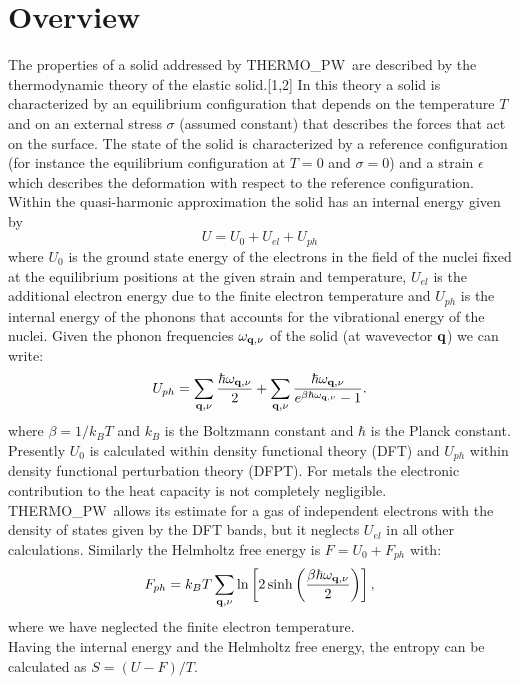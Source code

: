 \documentclass[12pt,a4paper]{article}
\def\tpw{{\sc THERMO\_PW}}
\begin{document}
\section{\color{coral}Overview}
The properties of a solid addressed by \tpw\ are described by the thermodynamic
theory of the elastic solid.[1,2] In this theory a solid is characterized by an
equilibrium configuration that depends on the temperature $T$ and on an
external stress $\sigma$ (assumed constant) that describes the forces 
that act on the surface. The state
of the solid is characterized by a reference configuration 
(for instance the equilibrium configuration at $T=0$ and $\sigma=0$) and 
a strain $\epsilon$ which describes the deformation with respect to the 
reference configuration. 
Within the quasi-harmonic approximation the solid has an internal
energy given by  
\begin{equation}
U=U_0 + U_{el} + U_{ph}
\end{equation}
where $U_0$ is the ground state energy of the electrons in the field 
of the nuclei fixed at the equilibrium positions at the given strain and
temperature, $U_{el}$ is the additional electron energy due to the 
finite electron temperature and $U_{ph}$ is the internal energy of the 
phonons that accounts for the vibrational energy of the nuclei. 
Given the phonon frequencies $\omega_{{\bf q},\nu}$ of the solid 
(at wavevector ${\bf q}$) we can write:
\begin{equation}
U_{ph} = \sum_{{\bf q},\nu} {\hbar \omega_{{\bf q},\nu} \over 2}
+ \sum_{{\bf q},\nu} {\hbar \omega_{{\bf q},\nu} \over 
e^{\beta \hbar \omega_{{\bf q},\nu}}-1}.
\label{uvib}
\end{equation}
where $\beta=1/ k_B T$ and $k_B$ is the Boltzmann constant and $\hbar$ is the
Planck constant.
Presently $U_0$ is calculated within density functional theory (DFT) and
$U_{ph}$ within density functional perturbation theory (DFPT). 
For metals the electronic contribution to the heat capacity is not 
completely negligible. \tpw\ allows its estimate for a gas of 
independent electrons with the density of states given by the DFT bands,
but it neglects $U_{el}$ in all other calculations.
Similarly the Helmholtz free energy is $F=U_0+F_{ph}$ with:
\begin{equation}
F_{ph} = k_B T \sum_{{\bf q},\nu} \ln \left[ 2 \sinh \left({\beta \hbar 
\omega_{{\bf q},\nu} \over 2}\right) \right],
\nonumber
\end{equation}
where we have neglected the finite electron temperature. \\
Having the internal energy and the Helmholtz free energy, the entropy can 
be calculated as $S=(U-F)/T$.
\end{document}
